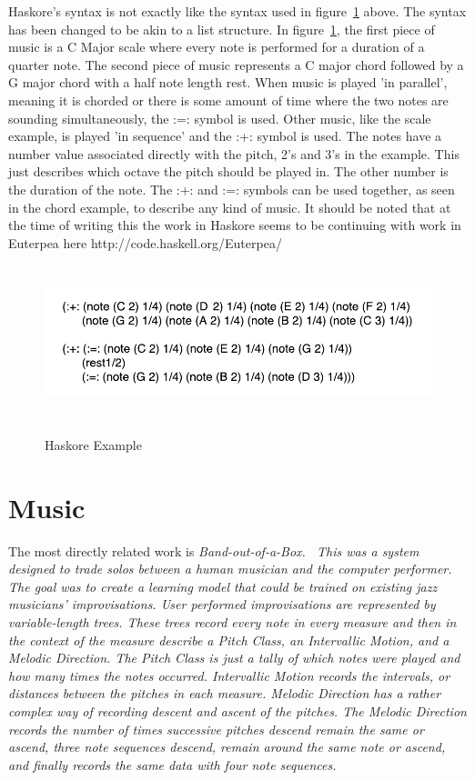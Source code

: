 \documentclass[12pt]{ucthesis}
\newcommand{\captionfonts}{\small\bf\ssp}
\begin{document}
Haskore's syntax is not exactly like the syntax used in figure~\ref{fig:haskore-example} above. The syntax has been changed to be akin to a list structure. In figure~\ref{fig:haskore-example}, the first piece of music is a C Major scale where every note is performed for a duration of a quarter note. The second piece of music represents a C major chord followed by a G major chord with a half note length rest. When music is played 'in parallel', meaning it is chorded or there is some amount of time where the two notes are sounding simultaneously, the :=: symbol is used. Other music, like the scale example, is played 'in sequence' and the :+: symbol is used. The notes have a number value associated directly with the pitch, 2's and 3's in the example. This just describes which octave the pitch should be played in. The other number is the duration of the note. The :+: and :=: symbols can be used together, as seen in the chord example, to describe any kind of music. It should be noted that at the time of writing this the work in Haskore seems to be continuing with work in Euterpea here http://code.haskell.org/Euterpea/

\begin{figure}
\includegraphics[height=45mm]{haskore-example.pdf}
\captionfonts
\caption[Haskore Example]{Haskore Example}
\label{fig:haskore-example}
\end{figure}

\section{Music}
\label{rw:music}
The most directly related work is \em{Band-out-of-a-Box}\em.~\cite{bob} This was a system designed to trade solos between a human musician and the computer performer. The goal was to create a learning model that could be trained on existing jazz musicians' improvisations. User performed improvisations are represented by variable-length trees. These trees record every note in every measure and then in the context of the measure describe a \em{Pitch Class, }\em an \em{Intervallic Motion, }\em and a \em{Melodic Direction. }\em The \em{Pitch Class }\em is just a tally of which notes were played and how many times the notes occurred. \em{Intervallic Motion }\em records the intervals, or distances between the pitches in each measure.  \em{Melodic Direction }\em has a rather complex way of recording descent and ascent of the pitches.  The \em{Melodic Direction }\em records the number of times successive pitches descend remain the same or ascend, three note sequences descend, remain around the same note or ascend, and finally records the same data with four note sequences. 
\end{document}
